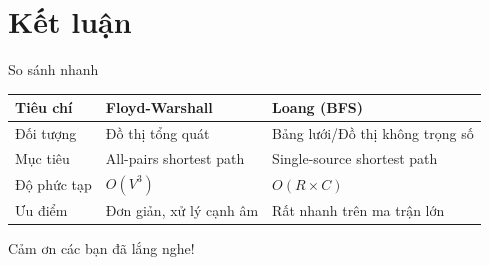 \documentclass[aspectratio=169]{beamer}
\begin{document}
\section{Kết luận}

\begin{frame}{So sánh nhanh}
\begin{table}
\centering
\begin{tabular}{|l|l|l|}
\hline
\textbf{Tiêu chí} & \textbf{Floyd-Warshall} & \textbf{Loang (BFS)} \\ \hline
Đối tượng & Đồ thị tổng quát & Bảng lưới/Đồ thị không trọng số \\ \hline
Mục tiêu & All-pairs shortest path & Single-source shortest path \\ \hline
Độ phức tạp & $O(V^3)$ & $O(R \times C)$ \\ \hline
Ưu điểm & Đơn giản, xử lý cạnh âm & Rất nhanh trên ma trận lớn \\ \hline
\end{tabular}
\end{table}
\end{frame}

\begin{frame}
\centering
\Huge
Cảm ơn các bạn đã lắng nghe!
\end{frame}
\end{document}

